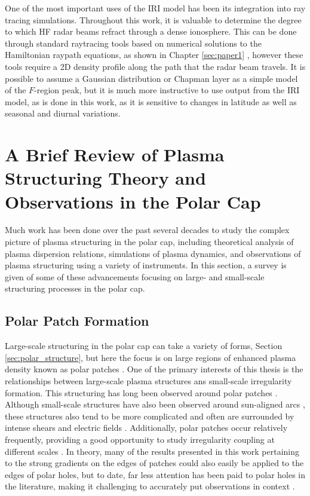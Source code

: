 One of the most important uses of the IRI model has been its integration into ray tracing simulations.  Throughout this work, it is valuable to determine the degree to which HF radar beams refract through a dense ionosphere.  This can be done through standard raytracing tools based on numerical solutions to the Hamiltonian raypath equations, as shown in Chapter \ref{sec:paper1} \citep{Haselgrove1963,Jones1975}, however these tools require a 2D density profile along the path that the radar beam travels.  It is possible to assume a Gaussian distribution or Chapman layer as a simple model of the \(F\)-region peak, but it is much more instructive to use output from the IRI model, as is done in this work, as it is sensitive to changes in latitude as well as seasonal and diurnal variations.

\section{A Brief Review of Plasma Structuring Theory and Observations in the Polar Cap}
Much work has been done over the past several decades to study the complex picture of plasma structuring in the polar cap, including theoretical analysis of plasma dispersion relations, simulations of plasma dynamics, and observations of plasma structuring using a variety of instruments.  In this section, a survey is given of some of these advancements focusing on large- and small-scale structuring processes in the polar cap.

\subsection{Polar Patch Formation}
\label{sec:lit_patches}
Large-scale structuring in the polar cap can take a variety of forms, Section \ref{sec:polar_structure}, but here the focus is on large regions of enhanced plasma density known as polar patches  \citep[e.g.][]{Weber1984,Weber1986,Buchau1983,Buchau1985}.  One of the primary interests of this thesis is the relationships between large-scale plasma structures ans small-scale irregularity formation.  This structuring has long been observed around polar patches \citep{Weber1984,Milan2002b,Moen2012}.  Although small-scale structures have also been observed around sun-aligned arcs \citep[e.g.][]{Koustov2012}, these structures also tend to be more complicated and often are surrounded by intense shears and electric fields \citep{Safargaleev2000,Aikio2002,Kozlovsky2007}.  Additionally, polar patches occur relatively frequently, providing a good opportunity to study irregularity coupling at different scales \citep{Rodger1996}.  In theory, many of the results presented in this work pertaining to the strong gradients on the edges of patches could also easily be applied to the edges of polar holes, but to date, far less attention has been paid to polar holes in the literature, making it challenging to accurately put observations in context \citep{Makarevich2015b}.

